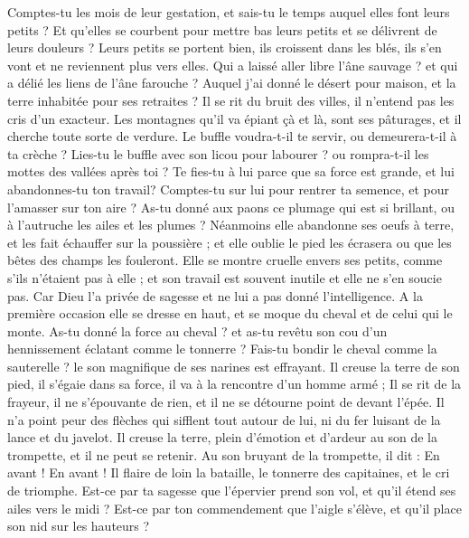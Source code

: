 \begin{multicols}{2}
Comptes-tu les mois de leur gestation, et sais-tu le temps auquel elles font leurs petits ?
Et qu'elles se courbent pour mettre bas leurs petits et se délivrent de leurs douleurs ?
Leurs petits se portent bien, ils croissent dans les blés, ils s’en vont et ne reviennent plus vers elles.
Qui a laissé aller libre l’âne sauvage ? et qui a délié les liens de l’âne farouche ?
Auquel j’ai donné le désert pour maison, et la terre inhabitée pour ses retraites ?
Il se rit du bruit des villes, il n'entend pas les cris d'un exacteur.
Les montagnes qu'il va épiant çà et là, sont ses pâturages, et il cherche toute sorte de verdure. 
Le buffle voudra-t-il te servir, ou demeurera-t-il à ta crèche ? 
Lies-tu le buffle avec son licou pour labourer ? ou rompra-t-il les mottes des vallées après toi ? 
Te fies-tu à lui parce que sa force est grande, et lui abandonnes-tu ton travail? 
Comptes-tu sur lui pour rentrer ta semence, et pour l'amasser sur ton aire ? 
As-tu donné aux paons ce plumage qui est si brillant, ou à l'autruche les ailes et les plumes ? 
Néanmoins elle abandonne ses oeufs à terre, et les fait échauffer sur la poussière ;
et elle oublie le pied les écrasera ou que les bêtes des champs les fouleront. 
Elle se montre cruelle envers ses petits, comme s'ils n'étaient pas à elle ; et son travail est souvent inutile et elle ne s'en soucie pas. 
Car Dieu l'a privée de sagesse et ne lui a pas donné l'intelligence.
A la première occasion elle se dresse en haut, et se moque du cheval et de celui qui le monte. 
As-tu donné la force au cheval ? et as-tu revêtu son cou d'un hennissement éclatant comme le tonnerre ? 
Fais-tu bondir le cheval comme la sauterelle ? le son magnifique de ses narines est effrayant.
Il creuse la terre de son pied, il s'égaie dans sa force, il va à la rencontre d'un homme armé ;
Il se rit de la frayeur, il ne s'épouvante de rien, et il ne se détourne point de devant l'épée.
Il n'a point peur des flèches qui sifflent tout autour de lui, ni du fer luisant de la lance et du javelot. 
Il creuse la terre, plein d'émotion et d'ardeur au son de la trompette, et il ne peut se retenir. 
Au son bruyant de la trompette, il dit : En avant ! En avant ! Il flaire de loin la bataille, le tonnerre des capitaines, et le cri de triomphe.
Est-ce par ta sagesse que l'épervier prend son vol, et qu'il étend ses ailes vers le midi ?
Est-ce par ton commendement que l'aigle s'élève, et qu'il place son nid sur les hauteurs ?

\end{multicols}
